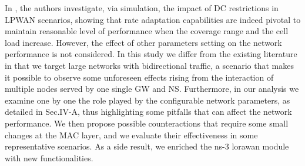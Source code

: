 In \cite{zucchetto_uncoordinated_2017},
	the authors investigate,
	via simulation,
	the impact of DC restrictions in LPWAN scenarios,
	showing that rate adaptation capabilities are indeed pivotal to maintain reasonable level of performance when the coverage range and the cell load increase.
However,
	the effect of other parameters setting on the network performance is not considered.
In this study we differ from the existing literature in that we target large networks with bidirectional traffic,
	a scenario that makes it possible to observe some unforeseen effects rising from the interaction of multiple nodes served by one single GW and NS.
Furthermore,
	in our analysis we examine one by one the role played by the configurable network parameters,
	as detailed in Sec.IV-A,
	thus highlighting some pitfalls that can affect the network performance.
We then propose possible counteractions that require some small changes at the MAC layer,
	and we evaluate their effectiveness in some representative scenarios.
As a side result,
	we enriched the ns-3 lorawan module with new functionalities.
